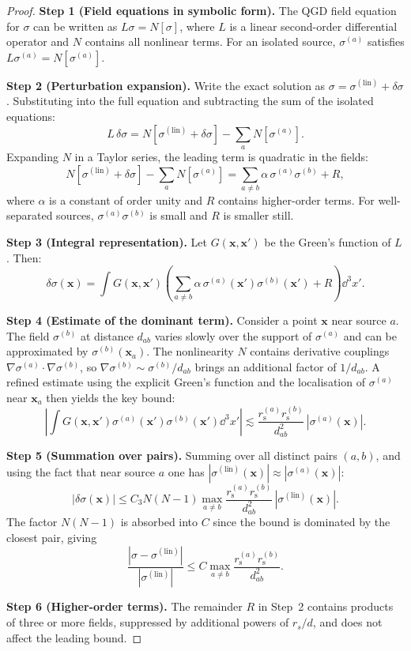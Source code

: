 \documentclass[11pt,a4paper]{article}
\theoremstyle{plain}
\theoremstyle{definition}
\theoremstyle{remark}
\newcommand{\boldx}{\mathbf{x}}
\newcommand{\rs}[1]{r_{\mathrm{s}}^{(#1)}}
\begin{document}
\begin{proof}
\textbf{Step 1 (Field equations in symbolic form).}
The QGD field equation for $\sigma$ can be written as $L\sigma = N[\sigma]$, where $L$ is a linear second-order differential operator and $N$ contains all nonlinear terms.  For an isolated source, $\sigma^{(a)}$ satisfies $L\sigma^{(a)} = N[\sigma^{(a)}]$.

\textbf{Step 2 (Perturbation expansion).}
Write the exact solution as $\sigma = \sigma^{(\mathrm{lin})} + \delta\sigma$.  Substituting into the full equation and subtracting the sum of the isolated equations:
\[
  L\,\delta\sigma = N[\sigma^{(\mathrm{lin})} + \delta\sigma] - \sum_a N[\sigma^{(a)}].
\]
Expanding $N$ in a Taylor series, the leading term is quadratic in the fields:
\[
  N[\sigma^{(\mathrm{lin})} + \delta\sigma] - \sum_a N[\sigma^{(a)}] = \sum_{a\neq b}\alpha\,\sigma^{(a)}\sigma^{(b)} + R,
\]
where $\alpha$ is a constant of order unity and $R$ contains higher-order terms.  For well-separated sources, $\sigma^{(a)}\sigma^{(b)}$ is small and $R$ is smaller still.

\textbf{Step 3 (Integral representation).}
Let $G(\boldx, \boldx')$ be the Green's function of $L$.  Then:
\[
  \delta\sigma(\boldx) = \int G(\boldx,\boldx')\!\left(\sum_{a\neq b}\alpha\,\sigma^{(a)}(\boldx')\sigma^{(b)}(\boldx') + R\right)\dd^3x'.
\]

\textbf{Step 4 (Estimate of the dominant term).}
Consider a point $\boldx$ near source $a$.  The field $\sigma^{(b)}$ at distance $d_{ab}$ varies slowly over the support of $\sigma^{(a)}$ and can be approximated by $\sigma^{(b)}(\boldx_a)$.  The nonlinearity $N$ contains derivative couplings $\nabla\sigma^{(a)}\cdot\nabla\sigma^{(b)}$, so $\nabla\sigma^{(b)} \sim \sigma^{(b)}/d_{ab}$ brings an additional factor of $1/d_{ab}$.  A refined estimate using the explicit Green's function and the localisation of $\sigma^{(a)}$ near $\boldx_a$ then yields the key bound:
\[
  \left|\int G(\boldx,\boldx')\sigma^{(a)}(\boldx')\sigma^{(b)}(\boldx')\dd^3x'\right| \lesssim \frac{\rs{a}\rs{b}}{d_{ab}^2}\,|\sigma^{(a)}(\boldx)|.
\]

\textbf{Step 5 (Summation over pairs).}
Summing over all distinct pairs $(a,b)$, and using the fact that near source $a$ one has $|\sigma^{(\mathrm{lin})}(\boldx)| \approx |\sigma^{(a)}(\boldx)|$:
\[
  |\delta\sigma(\boldx)| \leq C_3 N(N-1)\max_{a\neq b}\frac{\rs{a}\rs{b}}{d_{ab}^2}\,|\sigma^{(\mathrm{lin})}(\boldx)|.
\]
The factor $N(N-1)$ is absorbed into $C$ since the bound is dominated by the closest pair, giving
\[
  \frac{|\sigma - \sigma^{(\mathrm{lin})}|}{|\sigma^{(\mathrm{lin})}|} \leq C\max_{a\neq b}\frac{\rs{a}\rs{b}}{d_{ab}^2}.
\]

\textbf{Step 6 (Higher-order terms).}
The remainder $R$ in Step~2 contains products of three or more fields, suppressed by additional powers of $r_s/d$, and does not affect the leading bound.
\end{proof}
\end{document}
